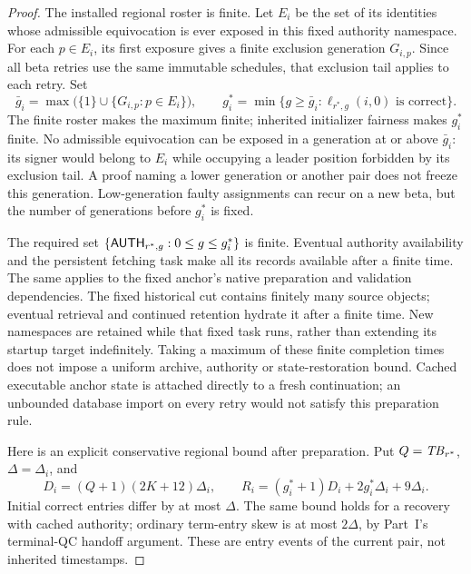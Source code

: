 \begin{proof}
The installed regional roster is finite. Let $E_i$ be the set of its
identities whose admissible equivocation is ever exposed in this fixed
authority namespace. For each $p\in E_i$, its first exposure gives a
finite exclusion generation $G_{i,p}$. Since all beta retries use the
same immutable schedules, that exclusion tail applies to each retry.
Set
\[
 \bar g_i=\max\bigl(\{1\}\cup\{G_{i,p}:p\in E_i\}\bigr),\qquad
 g_i^*=\min\{g\ge\bar g_i:
                   \ell_{r^*,g}(i,0)\text{ is correct}\}.
\]
The finite roster makes the maximum finite; inherited initializer
fairness makes $g_i^*$ finite. No admissible equivocation can be exposed
in a generation at or above $\bar g_i$: its signer would belong to
$E_i$ while occupying a leader position forbidden by its exclusion
tail. A proof naming a lower generation or another pair does not freeze
this generation. Low-generation faulty assignments can recur on a new
beta, but the number of generations before $g_i^*$ is fixed.

The required set $\{\mathsf{AUTH}_{r^*,g}:0\le g\le g_i^*\}$ is finite.
Eventual authority availability and the persistent fetching task make
all its records available after a finite time. The same applies to the
fixed anchor's native preparation and validation dependencies. The fixed
historical cut contains finitely many source objects; eventual retrieval
and continued retention hydrate it after a finite time. New namespaces
are retained while that fixed task runs, rather than extending its
startup target indefinitely. Taking a maximum of these finite completion
times does not impose a uniform archive, authority or state-restoration
bound. Cached executable
anchor state is attached directly to a fresh continuation; an unbounded
database import on every retry would not satisfy this preparation rule.

Here is an explicit conservative regional bound after preparation.
Put $Q=\mathit{TB}_{r^*}$, $\Delta=\Delta_i$, and
\[
 D_i=(Q+1)(2K+12)\Delta_i,\qquad
 R_i=(g_i^*+1)D_i+2g_i^*\Delta_i+9\Delta_i.
\]
Initial correct entries differ by at most $\Delta$. The same bound
holds for a recovery with cached authority; ordinary term-entry skew
is at most $2\Delta$, by Part~I's terminal-QC handoff argument. These
are entry events of the current pair, not inherited timestamps.


\end{proof}
